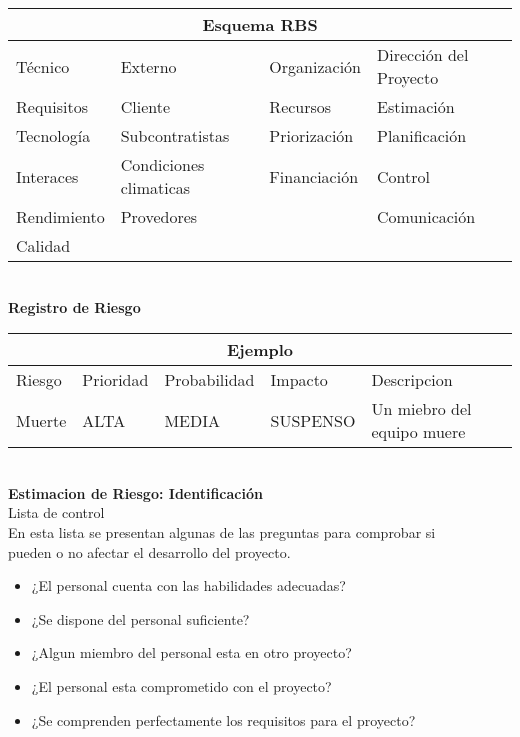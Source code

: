 \documentclass[12pt]{article}
\begin{document}
\begin{tabular}{ |p{2.5cm}||p{3cm}|p{2.5cm}|p{3cm}|  }
\hline
\multicolumn{4}{|c|}{Esquema RBS} \\
\hline
Técnico & Externo & Organización&Dirección del Proyecto\\
\hline
Requisitos   & Cliente    &Recursos&   Estimación\\
Tecnología &   Subcontratistas  & Priorización   &Planificación\\
Interaces &Condiciones climaticas & Financiación &  Control\\
Rendimiento    & Provedores &   &  Comunicación\\
Calidad &   &   &   \\
\hline
\end{tabular}\\

\textbf{Registro de Riesgo}\\
\begin{tabular}{ |p{2.5cm}||p{3cm}|p{3cm}|p{3cm}||p{3cm}|  }
\hline
\multicolumn{5}{|c|}{Ejemplo} \\
\hline
Riesgo & Prioridad & Probabilidad & Impacto & Descripcion\\
\hline
Muerte & ALTA    &MEDIA&   SUSPENSO & Un miebro del equipo muere\\
\hline
\end{tabular}\\

\textbf{Estimacion de Riesgo: Identificación}\\
Lista de control\\
En esta lista se presentan algunas de las preguntas para comprobar si\\
pueden o no afectar el desarrollo del proyecto.\\
\begin{itemize}
\item ¿El personal cuenta con las habilidades adecuadas?
\item ¿Se dispone del personal suficiente?
\item ¿Algun miembro del personal esta en otro proyecto?
\item ¿El personal esta comprometido con el proyecto?
\item ¿Se comprenden perfectamente los requisitos para el proyecto?
\end{itemize}
\end{document}
